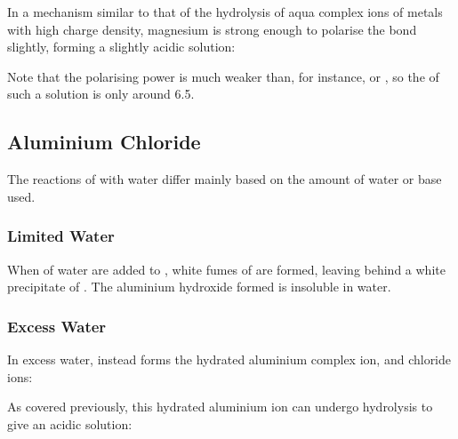 			In a mechanism similar to that of the hydrolysis of aqua complex ions of metals with high charge density, magnesium is strong
			enough to polarise the  bond slightly, forming a slightly acidic solution:


			Note that the polarising power is much weaker than, for instance,  or , so the \pH{} of such a
			solution is only around \num{6.5}.




		\subsection{Aluminium Chloride}

			The reactions of  with water differ mainly based on the amount of water or base used.

			\subsubsection{Limited Water}

				When  of water are added to , white fumes of  are formed, leaving behind a white
				precipitate of . The aluminium hydroxide formed is insoluble in water.



			\pagebreak
			\subsubsection{Excess Water}

				In excess water,  instead forms the hydrated aluminium complex ion, and chloride ions:


				As covered previously, this hydrated aluminium ion can undergo hydrolysis to give an acidic solution:


